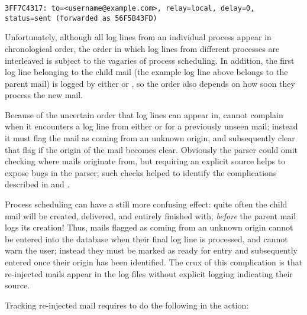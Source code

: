 \texttt{3FF7C4317: to=<username@example.com>, relay=local, \hfill{}
\newline{} \tab{} \tab{} delay=0, status=sent (forwarded as 56F5B43FD)}

Unfortunately, although all log lines from an individual process appear in
chronological order, the order in which log lines from different processes
are interleaved is subject to the vagaries of process scheduling.  In
addition, the first log line belonging to the child mail (the example log
line above belongs to the parent mail) is logged by either  or
, so the order also depends on how soon they process the
new mail.

Because of the uncertain order that log lines can appear in, \parsername{}
cannot complain when it encounters a log line from either  or
 for a previously unseen mail; instead it must flag the
mail as coming from an unknown origin, and subsequently clear that flag if
the origin of the mail becomes clear.  Obviously the parser could omit
checking where mails originate from, but requiring an explicit source helps
to expose bugs in the parser; such checks helped to identify the
complications described in  and
.

Process scheduling can have a still more confusing effect: quite often the
child mail will be created, delivered, and entirely finished with,
\textit{before\/} the parent mail logs its creation!  Thus, mails flagged
as coming from an unknown origin cannot be entered into the database when
their final log line is processed, and \parsername{} cannot warn the user;
instead they must be marked as ready for entry and subsequently entered
once their origin has been identified.  The crux of this complication is
that re-injected mails appear in the log files without explicit logging
indicating their source.

Tracking re-injected mail requires \parsername{} to do the following in the
 action:

